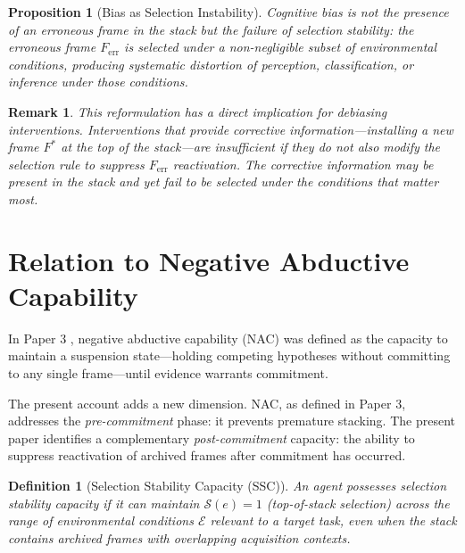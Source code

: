 \documentclass[12pt]{article}
\newtheorem{definition}{Definition}
\newtheorem{proposition}{Proposition}
\newtheorem{remark}{Remark}
\begin{document}
\begin{proposition}[Bias as Selection Instability]
\label{prop:bias-selection}
Cognitive bias is not the presence of an erroneous frame in the
stack but the failure of selection stability: the erroneous frame
$F_\mathrm{err}$ is selected under a non-negligible subset of
environmental conditions, producing systematic distortion of
perception, classification, or inference under those conditions.
\end{proposition}

\begin{remark}
This reformulation has a direct implication for debiasing
interventions.
Interventions that provide corrective information---installing
a new frame $F^*$ at the top of the stack---are insufficient
if they do not also modify the selection rule to suppress
$F_\mathrm{err}$ reactivation.
The corrective information may be present in the stack and yet
fail to be selected under the conditions that matter most.
\end{remark}

\section{Relation to Negative Abductive Capability}

In Paper 3 \cite{minamoto2026overwrite}, negative abductive
capability (NAC) was defined as the capacity to maintain a
suspension state---holding competing hypotheses without committing
to any single frame---until evidence warrants commitment.

The present account adds a new dimension.
NAC, as defined in Paper 3, addresses the \emph{pre-commitment}
phase: it prevents premature stacking.
The present paper identifies a complementary \emph{post-commitment}
capacity: the ability to suppress reactivation of archived frames
after commitment has occurred.

\begin{definition}[Selection Stability Capacity (SSC)]
An agent possesses \emph{selection stability capacity} if it can
maintain $\mathcal{S}(e) = 1$ (top-of-stack selection) across
the range of environmental conditions $\mathcal{E}$ relevant to
a target task, even when the stack contains archived frames
with overlapping acquisition contexts.
\end{definition}
\end{document}
